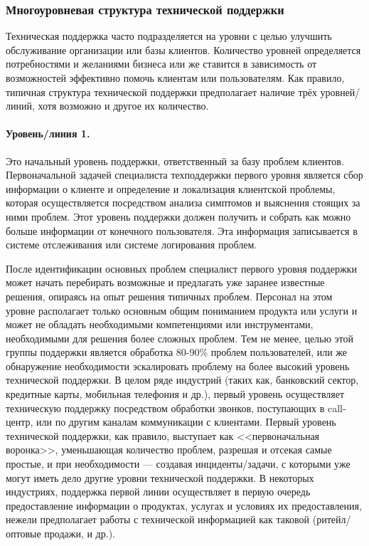 \documentclass{../../text-style}
\begin{document}
\subsubsection{Многоуровневая структура технической поддержки}

Техническая поддержка часто подразделяется на уровни с целью улучшить обслуживание организации или базы клиентов. Количество уровней определяется потребностями и желаниями бизнеса или же ставится в зависимость от возможностей эффективно помочь клиентам или пользователям. Как правило, типичная структура технической поддержки предполагает наличие трёх уровней/линий, хотя возможно и другое их количество.

\paragraph{Уровень/линия 1.} Это начальный уровень поддержки, ответственный за базу проблем клиентов. Первоначальной задачей специалиста техподдержки первого уровня является сбор информации о клиенте и определение и локализация клиентской проблемы, которая осуществляется посредством анализа симптомов и выяснения стоящих за ними проблем. Этот уровень поддержки должен получить и собрать как можно больше информации от конечного пользователя. Эта информация записывается в системе отслеживания или системе логирования проблем.

После идентификации основных проблем специалист первого уровня поддержки может начать перебирать возможные и предлагать уже заранее известные решения, опираясь на опыт решения типичных проблем. Персонал на этом уровне располагает только основным общим пониманием продукта или услуги и может не обладать необходимыми компетенциями или инструментами, необходимыми для решения более сложных проблем. Тем не менее, целью этой группы поддержки является обработка 80-90\% проблем пользователей, или же обнаружение необходимости эскалировать проблему на более высокий уровень технической поддержки. В целом ряде индустрий (таких как, банковский сектор, кредитные карты, мобильная телефония и др.), первый уровень осуществляет техническую поддержку посредством обработки звонков, поступающих в call-центр, или по другим каналам коммуникации с клиентами. Первый уровень технической поддержки, как правило, выступает как <<первоначальная воронка>>, уменьшающая количество проблем, разрешая и отсекая самые простые, и при необходимости --- создавая инциденты/задачи, с которыми уже могут иметь дело другие уровни технической поддержки. В некоторых индустриях, поддержка первой линии осуществляет в первую очередь предоставление информации о продуктах, услугах и условиях их предоставления, нежели предполагает работы с технической информацией как таковой (ритейл/оптовые продажи, и др.).
\end{document}
